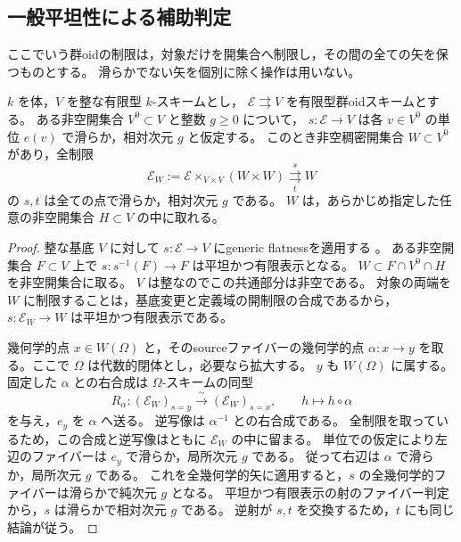 \subsection{一般平坦性による補助判定}

ここでいう群oidの制限は，対象だけを開集合へ制限し，その間の全ての矢を保つものとする。
滑らかでない矢を個別に除く操作は用いない。

\begin{lemma}
\label{lem:generic-flat-full-groupoid}
$k$ を体，$V$ を整な有限型 $k$-スキームとし，
$\mathcal E\rightrightarrows V$ を有限型群oidスキームとする。
ある非空開集合 $V^0\subset V$ と整数 $g\ge0$ について，
$s:\mathcal E\to V$ は各 $v\in V^0$ の単位 $e(v)$ で滑らか，相対次元 $g$ と仮定する。
このとき非空稠密開集合 $W\subset V^0$ があり，全制限
\[
 \mathcal E_W:=\mathcal E\times_{V\times V}(W\times W)
       \underset{t}{\overset{s}{\rightrightarrows}}W
\]
の $s,t$ は全ての点で滑らか，相対次元 $g$ である。
$W$ は，あらかじめ指定した任意の非空開集合 $H\subset V$ の中に取れる。
\end{lemma}
\begin{proof}
整な基底 $V$ に対して $s:\mathcal E\to V$ にgeneric flatnessを適用する
\cite[Tag 052A]{StacksProject}。
ある非空開集合 $F\subset V$ 上で
$s:s^{-1}(F)\to F$ は平坦かつ有限表示となる。
$W\subset F\cap V^0\cap H$ を非空開集合に取る。
$V$ は整なのでこの共通部分は非空である。
対象の両端を $W$ に制限することは，基底変更と定義域の開制限の合成であるから，
$s:\mathcal E_W\to W$ は平坦かつ有限表示である。

幾何学的点 $x\in W(\Omega)$ と，そのsourceファイバーの幾何学的点
$\alpha:x\to y$ を取る。ここで $\Omega$ は代数的閉体とし，必要なら拡大する。
$y$ も $W(\Omega)$ に属する。
固定した $\alpha$ との右合成は $\Omega$-スキームの同型
\[
 R_\alpha:(\mathcal E_W)_{s=y}\xrightarrow{\ \sim\ }
                 (\mathcal E_W)_{s=x},
 \qquad h\longmapsto h\circ\alpha
\]
を与え，$e_y$ を $\alpha$ へ送る。
逆写像は $\alpha^{-1}$ との右合成である。
全制限を取っているため，この合成と逆写像はともに $\mathcal E_W$ の中に留まる。
単位での仮定により左辺のファイバーは $e_y$ で滑らか，局所次元 $g$ である。
従って右辺は $\alpha$ で滑らか，局所次元 $g$ である。
これを全幾何学的矢に適用すると，$s$ の全幾何学的ファイバーは滑らかで純次元 $g$ となる。
平坦かつ有限表示の射のファイバー判定
\cite[Tag 01V8]{StacksProject}から，$s$ は滑らかで相対次元 $g$ である。
逆射が $s,t$ を交換するため，$t$ にも同じ結論が従う。
\end{proof}

